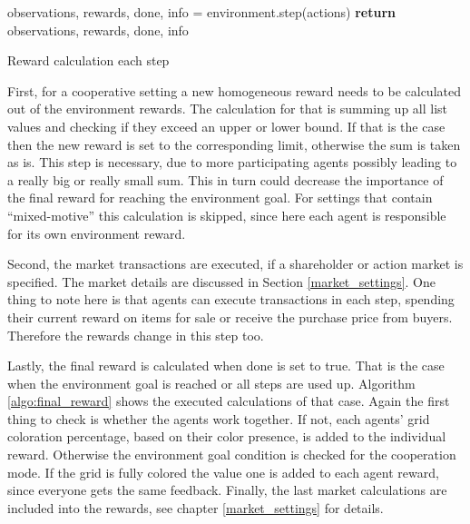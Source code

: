 \begin{algorithm}[H]
    \DontPrintSemicolon
    observations, rewards, done, info = environment.step(actions)\;
    \textbf{return} observations, rewards, done, info\;
    \caption{Reward calculation each step}\label{algo:step_reward}
\end{algorithm}

First, for a cooperative setting a new homogeneous reward needs to be calculated out of the environment rewards. The calculation for that is summing up all list values and checking if they exceed an upper or lower bound. If that is the case then the new reward is set to the corresponding limit, otherwise the sum is taken as is. This step is necessary, due to more participating agents possibly leading to a really big or really small sum. This in turn could decrease the importance of the final reward for reaching the environment goal. For settings that contain ``mixed-motive'' this calculation is skipped, since here each agent is responsible for its own environment reward.

Second, the market transactions are executed, if a shareholder or action market is specified. The market details are discussed in Section \ref{market_settings}. One thing to note here is that agents can execute transactions in each step, spending their current reward on items for sale or receive the purchase price from buyers. Therefore the rewards change in this step too.

Lastly, the final reward is calculated when done is set to true. That is the case when the environment goal is reached or all steps are used up. Algorithm \ref{algo:final_reward} shows the executed calculations of that case. Again the first thing to check is whether the agents work together. If not, each agents' grid coloration percentage, based on their color presence, is added to the individual reward. Otherwise the environment goal condition is checked for the cooperation mode. If the grid is fully colored the value one is added to each agent reward, since everyone gets the same feedback. Finally, the last market calculations are included into the rewards, see chapter \ref{market_settings} for details.

